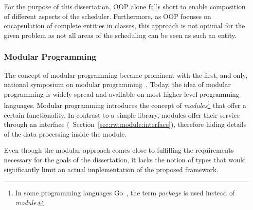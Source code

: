 For the purpose of this dissertation, \ac{OOP} alone falls short to enable composition of different aspects of the scheduler. Furthermore, as \ac{OOP} focuses on encapsulation of complete entities in classes, this approach is not optimal for the given problem as not all areas of the scheduling can be seen as such an entity.

\subsubsection{Modular Programming}

The concept of modular programming became prominent with the first, and only, national symposium on modular programming~\cite{Barnett-1968-ModularProgramming}. Today, the idea of modular programming is widely spread and available on most higher-level programming languages. Modular programming introduces the concept of \emph{modules}\footnote{In some programming languages \eg{} Go~\cite{Go}, the term \emph{package} is used instead of \emph{module}.} that offer a certain functionality. In contrast to a simple library, modules offer their service through an interface (\cf{}~Section~\ref{sec:rw:module:interface}), therefore hiding details of the data processing inside the module.

Even though the modular approach comes close to fulfilling the requirements necessary for the goals of the dissertation, it lacks the notion of types that would significantly limit an actual implementation of the proposed framework.
